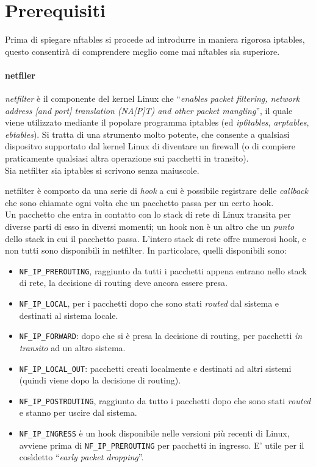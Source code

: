 \section{Prerequisiti}
Prima di spiegare nftables si procede ad introdurre in maniera rigorosa iptables,
questo consentirà di comprendere meglio come mai nftables sia superiore.

\paragraph{netfiler}
\textit{netfilter} è il componente del kernel Linux che
``\textit{enables packet filtering, network address [and port] translation
(NA[P]T) and other packet mangling}'', il quale viene utilizzato mediante il
popolare programma iptables (ed \textit{ip6tables}, \textit{arptables},
\textit{ebtables}). Si tratta di una strumento molto
potente, che consente a qualsiasi dispositvo supportato dal kernel Linux
di diventare un firewall (o di compiere praticamente qualsiasi altra operazione
sui pacchetti in transito).\\
Sia netfilter sia iptables si scrivono senza maiuscole.


netfilter è composto da una serie di \textit{hook} a cui è possibile registrare
delle \textit{callback} che sono chiamate ogni volta che un pacchetto passa per
un certo hook.\\
Un pacchetto che entra in contatto con lo stack di rete di Linux transita per
diverse parti di esso in diversi momenti; un hook non è un altro che un \textit{punto} dello stack
in cui il pacchetto passa.
L'intero stack di rete offre numerosi hook, e non tutti sono disponibili in netfilter.
In particolare, quelli disponibili sono:
\begin{itemize}
  \item \texttt{NF\_IP\_PREROUTING}, raggiunto da tutti i pacchetti appena entrano nello
  stack di rete, la decisione di routing deve ancora essere presa.
  \item \texttt{NF\_IP\_LOCAL}, per i pacchetti dopo che sono stati \textit{routed}
  dal sistema e destinati al sistema locale.
  \item \texttt{NF\_IP\_FORWARD}: dopo che si è presa la decisione di routing,
  per pacchetti \textit{in transito} ad un altro sistema.
  \item \texttt{NF\_IP\_LOCAL\_OUT}: pacchetti creati localmente e destinati ad
  altri sistemi (quindi viene dopo la decisione di routing).
  \item \texttt{NF\_IP\_POSTROUTING}, raggiunto da tutto i pacchetti dopo che
  sono stati \textit{routed} e stanno per uscire dal sistema.
  \item \texttt{NF\_IP\_INGRESS} è un hook disponibile nelle versioni più recenti di
  Linux, avviene prima di \texttt{NF\_IP\_PREROUTING} per pacchetti in ingresso.
  E' utile per il cosìdetto ``\textit{early packet dropping}''.
\end{itemize}

